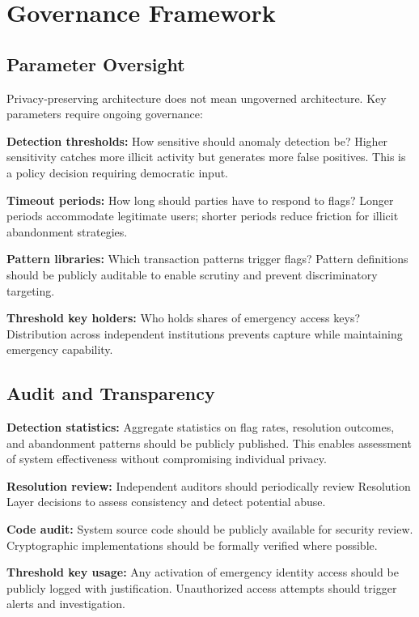 \documentclass[11pt]{article}
\begin{document}
\section{Governance Framework}

\subsection{Parameter Oversight}

Privacy-preserving architecture does not mean ungoverned architecture. Key parameters require ongoing governance:

\textbf{Detection thresholds:} How sensitive should anomaly detection be? Higher sensitivity catches more illicit activity but generates more false positives. This is a policy decision requiring democratic input.

\textbf{Timeout periods:} How long should parties have to respond to flags? Longer periods accommodate legitimate users; shorter periods reduce friction for illicit abandonment strategies.

\textbf{Pattern libraries:} Which transaction patterns trigger flags? Pattern definitions should be publicly auditable to enable scrutiny and prevent discriminatory targeting.

\textbf{Threshold key holders:} Who holds shares of emergency access keys? Distribution across independent institutions prevents capture while maintaining emergency capability.

\subsection{Audit and Transparency}

\textbf{Detection statistics:} Aggregate statistics on flag rates, resolution outcomes, and abandonment patterns should be publicly published. This enables assessment of system effectiveness without compromising individual privacy.

\textbf{Resolution review:} Independent auditors should periodically review Resolution Layer decisions to assess consistency and detect potential abuse.

\textbf{Code audit:} System source code should be publicly available for security review. Cryptographic implementations should be formally verified where possible.

\textbf{Threshold key usage:} Any activation of emergency identity access should be publicly logged with justification. Unauthorized access attempts should trigger alerts and investigation.
\end{document}
